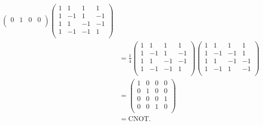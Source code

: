\begin{solution}
\begin{align*}
\begin{pmatrix}
            0 & 1 & 0 & 0 \\
        \end{pmatrix}
        \begin{pmatrix}
            1 & 1 & 1 & 1 \\
            1 & -1 & 1 & -1 \\
            1 & 1 & -1 & -1 \\
            1 & -1 & -1 & 1 \\
        \end{pmatrix}
        \\
        &= \frac14
        \begin{pmatrix}
            1 & 1 & 1 & 1 \\
            1 & -1 & 1 & -1 \\
            1 & 1 & -1 & -1 \\
            1 & -1 & -1 & 1 \\
        \end{pmatrix}
        \begin{pmatrix}
            1 & 1 & 1 & 1 \\
            1 & -1 & -1 & 1 \\
            1 & 1 & -1 & -1 \\
            1 & -1 & 1 & -1 \\
        \end{pmatrix}
        \\
        &= 
        \begin{pmatrix}
            1 & 0 & 0 & 0 \\
            0 & 1 & 0 & 0 \\
            0 & 0 & 0 & 1 \\
            0 & 0 & 1 & 0 \\
        \end{pmatrix}
        \\
        &= \text{CNOT}.
    \end{align*}
\end{solution}